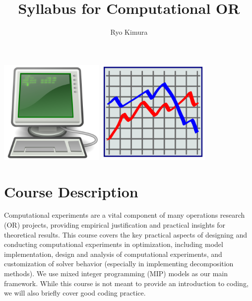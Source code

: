 \documentclass[12pt]{article}
\title{Syllabus for Computational OR}
\author{Ryo Kimura}
\begin{document}
\maketitle

\begin{center}
    \includegraphics[height=2in]{computer-green-unix-large.png}
    \hspace{0.5in}
    \includegraphics[height=2in]{xoseluis-xoseluis-grafica1-large.png}
\end{center}
\section*{Course Description}
Computational experiments are a vital component of many operations research (OR) projects, providing empirical justification and practical insights for theoretical results. This course covers the key practical aspects of designing and conducting computational experiments in optimization, including model implementation, design and analysis of computational experiments, and customization of solver behavior (especially in implementing decomposition methods). We use mixed integer programming (MIP) models as our main framework. While this course is not meant to provide an introduction to coding, we will also briefly cover good coding practice.
\end{document}
